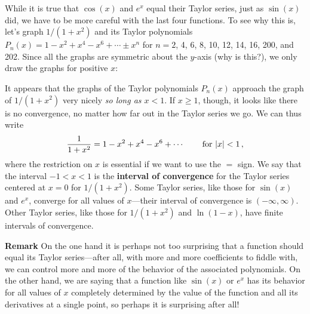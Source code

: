 {{{{While it is true that $\cos(x)$ and $e^x$ equal their Taylor series, just as $\sin(x)$ did, we have to be more careful with the last four functions.  To see why this is, let's graph $1/(1+x^2)$ and its Taylor polynomials $P_n(x) = 1-x^2+ x^4-x^6+\cdots \pm x^n$ for $n=2$, 4, 6, 8, 10, 12, 14, 16, 200, and 202.  Since all the graphs are symmetric about the $y$-axis (why is this?), we only draw the graphs for positive $x$:

\vspace*{2.3in}

It appears that the 
graphs of the Taylor polynomials $P_n(x)$ approach the graph of $1/(1+x^2)$ very nicely {\em so long as $x < 1$}.  If $x\geq1$, though, it looks like there is no convergence, no matter how far out in the Taylor series we go.  We can thus write
\[
{\displaystyle {1 \over {1+x^2}} }= {\displaystyle 1-x^2+x^4-x^6+\cdots} \qquad \mbox{ for } |x|<1 \, ,
\]
where the restriction on $x$ is essential if we want to use the $=$ sign. We say that the interval $-1<x<1$ is the {\bf interval of convergence} for the Taylor series centered at $x=0$ for $1/(1+x^2)$.  Some Taylor series, like those for $\sin(x)$ and $e^x$, converge for all values of $x$---their interval of convergence is $(-\infty, \infty)$.  Other Taylor series, like those for $1/(1+x^2)$ and $\ln(1-x)$, have finite intervals of convergence.  





{\bf Remark}  On the one hand it is perhaps not too surprising that a function should equal its Taylor series---after all, with more and more coefficients to fiddle with, we can control more and more of the behavior of the associated polynomials.  On the other hand, we are saying that a function like $\sin(x)$ or $e^x$ has its behavior for all values of $x$ completely determined by the value of the function and all its derivatives at a single point, so perhaps it is surprising after all!

}}}}
